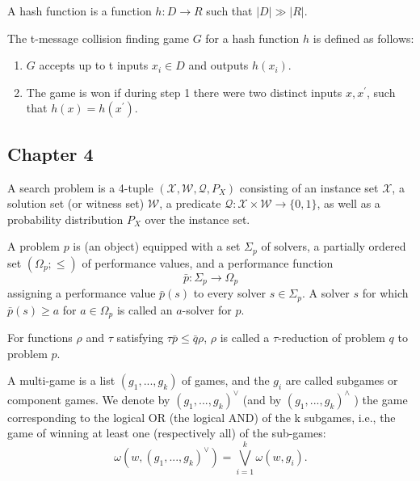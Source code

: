 \documentclass[a4paper,german]{article}
\newenvironment{customdef}[1]{\renewcommand\theinnercustomdef{#1}\innercustomdef}{\endinnercustomdef}
\begin{document}
\begin{customdef}{3.19}
	A hash function is a function $h: D \rightarrow R$ such that $|D| \gg |R|$.
\end{customdef}

\begin{customdef}{3.20}
	The t-message collision finding game $G$ for a hash function $h$ is defined as follows:

	\begin{enumerate}

		\item  $G$ accepts up to t inputs $x_i \in D$ and outputs $h(x_i)$.
		\item  The game is won if during step 1 there were two distinct inputs $x, x^\prime$, such that $h(x) = h(x^\prime)$.

	\end{enumerate}
\end{customdef}

\subsection*{Chapter 4}

\begin{customdef}{4.1}
  A search problem is a 4-tuple $(\mathcal{X}, \mathcal{W}, \mathcal{Q}, P_ X )$ consisting of an instance set $\mathcal{X}$, a solution set (or witness set) $\mathcal{W}$, a predicate $\mathcal{Q} : \mathcal{X} \times \mathcal{W} \rightarrow \{0, 1\}$, as
well as a probability distribution $P_X$ over the instance set.
\end{customdef}

\begin{customdef}{4.2}
  A problem $p$ is (an object) equipped with a set $\Sigma_p$ of solvers, a partially ordered set $(\Omega_p; \leq)$ of performance values, and a performance function
  \[
    \bar{p} : \Sigma_p \rightarrow \Omega_p
  \]
  assigning a performance value $\bar{p}(s)$ to every solver $s \in \Sigma_p$. A solver $s$ for which $\bar{p}(s) \geq a$ for $a \in \Omega_p$ is called an $a$-solver for $p$.
\end{customdef}

\begin{customdef}{4.3}
  For functions $\rho$ and $\tau$ satisfying $\tau \bar{p} \leq \bar{q} \rho$, $\rho$ is called a $\tau$-reduction of problem $q$ to problem $p$.
\end{customdef}

\begin{customdef}{4.6}
  A multi-game is a list $(g_1, ..., g_k)$ of games, and the $g_i$ are called subgames or component games. We denote by $(g_1, ..., g_k )^{\lor}$ (and by $(g_1, ..., g_k)^{\land}$ ) the game corresponding to the logical OR (the logical AND) of the k subgames, i.e., the game of winning at least one (respectively all) of the sub-games:
  \[
    \omega(w, (g_1, ..., g_k)^{\lor}) = \bigvee\limits_{i=1}^k \omega(w, g_i)
  .\]
\end{customdef}
\end{document}
